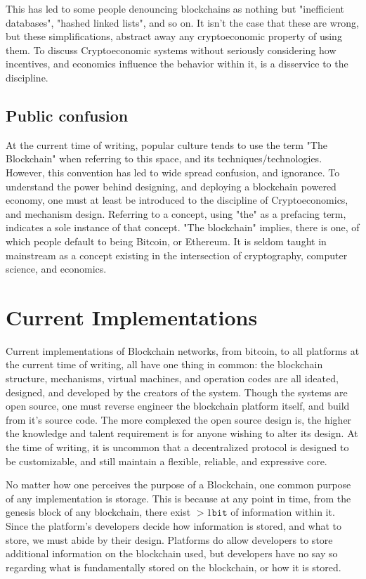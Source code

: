 \documentclass[12pt, titlepage, twocolumn]{report}
\begin{document}
This has led to some people denouncing blockchains as nothing but "inefficient databases", "hashed linked lists", and so on. It isn't the case that these are wrong, but these simplifications, abstract away any cryptoeconomic property of using them. To discuss Cryptoeconomic systems without seriously considering how incentives, and economics influence the behavior within it, is a disservice to the discipline.




\subsection{Public confusion}
At the current time of writing, popular culture tends to use the term "The Blockchain" when referring to this space, and its techniques/technologies. However, this convention has led to wide spread confusion, and ignorance. To understand the power behind designing, and deploying a blockchain powered economy, one must at least be introduced to the discipline of Cryptoeconomics, and mechanism design. Referring to a concept, using "the" as a prefacing term, indicates a sole instance of that concept. "The blockchain" implies, there is one, of which people default to being Bitcoin, or Ethereum. It is seldom taught in mainstream as a concept existing in the intersection of cryptography, computer science, and economics. 




\section{Current Implementations}
Current implementations of Blockchain networks, from bitcoin, to all platforms at the current time of writing, all have one thing in common: the blockchain structure, mechanisms, virtual machines, and operation codes are all ideated, designed, and developed by the creators of the system. Though the systems are open source, one must reverse engineer the blockchain platform itself, and build from it's source code. The more complexed the open source design is, the higher the knowledge and talent requirement is for anyone wishing to alter its design. At the time of writing, it is uncommon that a decentralized protocol is designed to be customizable, and still maintain a flexible, reliable, and expressive core.

No matter how one perceives the purpose of a Blockchain, one common purpose of any implementation is storage. This is because at any point in time, from the genesis block of any blockchain, there exist \(> 1 \texttt{bit}\) of information within it. Since the platform's developers decide how information is stored, and what to store, we must abide by their design. Platforms do allow developers to store additional information on the blockchain used, but developers have no say so regarding what is fundamentally stored on the blockchain, or how it is stored. 
\end{document}
